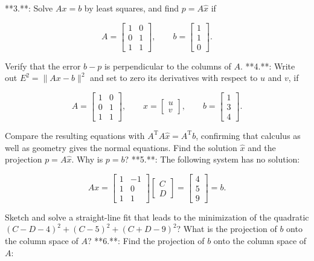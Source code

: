 

**3.**: Solve \(Ax=b\) by least squares, and find \(p=A\widehat{x}\) if

\[A=\begin{bmatrix}1&0\\ 0&1\\ 1&1\end{bmatrix},\qquad b=\begin{bmatrix}1\\ 1\\ 0\end{bmatrix}.\]

Verify that the error \(b-p\) is perpendicular to the columns of \(A\).
**4.**: Write out \(E^{2}=\|Ax-b\|^{2}\) and set to zero its derivatives with respect to \(u\) and \(v\), if

\[A=\begin{bmatrix}1&0\\ 0&1\\ 1&1\end{bmatrix},\qquad x=\begin{bmatrix}u\\ v\end{bmatrix},\qquad b=\begin{bmatrix}1\\ 3\\ 4\end{bmatrix}.\]

Compare the resulting equations with \(A^{\mathrm{T}}A\widehat{x}=A^{\mathrm{T}}b\), confirming that calculus as well as geometry gives the normal equations. Find the solution \(\widehat{x}\) and the projection \(p=A\widehat{x}\). Why is \(p=b\)?
**5.**: The following system has no solution:

\[Ax=\begin{bmatrix}1&-1\\ 1&0\\ 1&1\end{bmatrix}\begin{bmatrix}C\\ D\end{bmatrix}=\begin{bmatrix}4\\ 5\\ 9\end{bmatrix}=b.\]

Sketch and solve a straight-line fit that leads to the minimization of the quadratic \((C-D-4)^{2}+(C-5)^{2}+(C+D-9)^{2}\)? What is the projection of \(b\) onto the column space of \(A\)?
**6.**: Find the projection of \(b\) onto the column space of \(A\):

